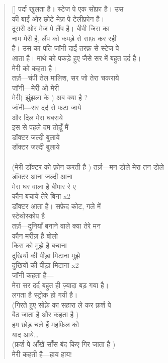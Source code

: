 \begin{verse}[\versewidth]\texthindi{
पर्दा खुलता है। स्टेज पे एक सोफ़ा है। उस\\
की बाईं ओर छोटे मेज़ पे टेलीफ़ोन है। \\
दूसरी ओर मेज़ पे लैंप है। बीवी जिस का \\
नाम मेरी है, लैंप को कपड़े से साफ़ कर रही \\
है। उस का पति जॉनी दाईं तरफ़ से स्टेज पे\\
आता है। माथे को पकड़े हुए जैसे सर में बहुत दर्द है।\\
मेरी को कहता है।\\
तर्ज़—चंपी तेल मालिश, सर जो तेरा चकराये\\
जॉनी—मेरी ओ मेरी\\
मेरी(
  झुंझला के 
 ) अब क्या है ?\\
जॉनी—सर दर्द से फटा जाये\\
और दिल मेरा घबराये\\
इस से पहले दम तोड़ूँ मैं\\
डॉक्टर जल्दी बुलाये\\
डॉक्टर जल्दी बुलाये\\
\\
(मेरी डॉक्टर को फ़ोन करती है
)
तर्ज़—मन डोले मेरा तन डोले\\
डॉक्टर आना जल्दी आना\\
मेरा घर वाला है बीमार रे ए\\
कौन बचाये तेरे बिना x2\\
डॉक्टर आता है। सफ़ेद कोट, गले में\\
स्टेथोस्कोप है\\
तर्ज़—दुनियाँ बनाने वाले क्या तेरे मन\\
कौन मरीज़ है बोलो\\
किस को मुझे है बचाना\\
दुखियों की पीड़ा मिटाना मुझे\\
दुखियों की पीड़ा मिटाना x2\\
जॉनी कहता है—\\
मेरा सर दर्द बहुत ही ज़्यादा बड़ गया है।\\
लगता है स्ट्रोक हो गयी है।\\
(गिरते हुए सोफ़े का सहारा ले कर फ़र्श पे\\
बैठ जाता है और कहता है
)\\
हम छोड़ चले हैं महफ़िल को\\
याद आये…\\
(फ़र्श पे आँखें साँस बंद किए गिर जाता है
)\\
मेरी कहती है—हाय हाय!\\
}
\end{verse}

